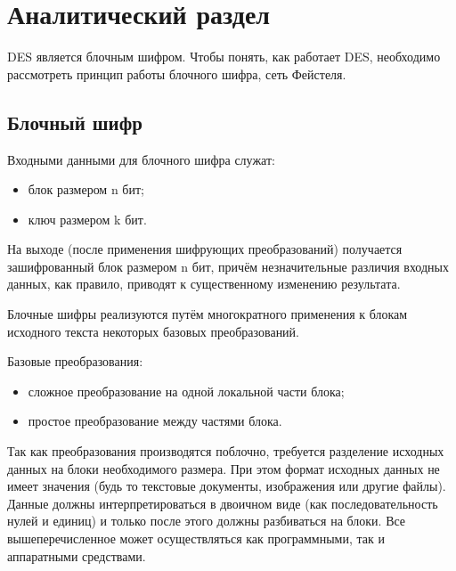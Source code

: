 \chapter{Аналитический раздел}
\label{cha:analysis}

DES является блочным шифром. Чтобы понять, как работает DES, необходимо рассмотреть принцип работы блочного шифра, сеть Фейстеля.
\section{Блочный шифр}

Входными данными для блочного шифра служат:
\begin{itemize}
    \item блок размером n бит;
    \item ключ размером k бит.
\end{itemize}

На выходе (после применения шифрующих преобразований) получается зашифрованный блок размером n бит, причём незначительные различия входных данных, как правило, приводят к существенному изменению результата.

Блочные шифры реализуются путём многократного применения к блокам исходного текста некоторых базовых преобразований.

Базовые преобразования:
\begin{itemize}
    \item сложное преобразование на одной локальной части блока;
    \item простое преобразование между частями блока.
\end{itemize}

Так как преобразования производятся поблочно, требуется разделение исходных данных на блоки необходимого размера. При этом формат исходных данных не имеет значения (будь то текстовые документы, изображения или другие файлы). Данные должны интерпретироваться в двоичном виде (как последовательность нулей и единиц) и только после этого должны разбиваться на блоки. Все вышеперечисленное может осуществляться как программными, так и аппаратными средствами.

